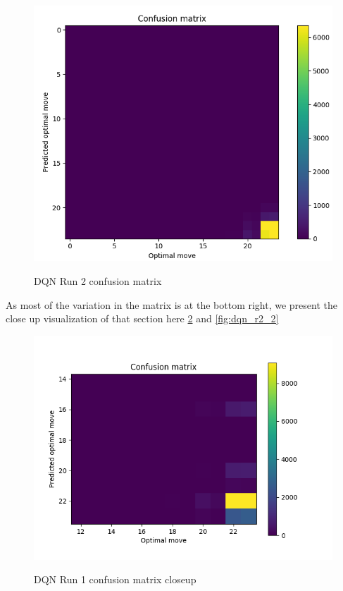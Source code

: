 \begin{figure}
\centering
\includegraphics[scale=0.6]{cm3.png}\\
\caption{DQN Run 2 confusion matrix}
\label{fig:dqn_r2_1}
\end{figure}

As most of the variation in the matrix is at the bottom right, we present the close up visualization of that section here \ref{fig:dqn_r1_2} and \ref{fig:dqn_r2_2}

\begin{figure}
\centering
\includegraphics[scale=1]{cm2.png}\\
\caption{DQN Run 1 confusion matrix closeup}
\label{fig:dqn_r1_2}
\end{figure}

